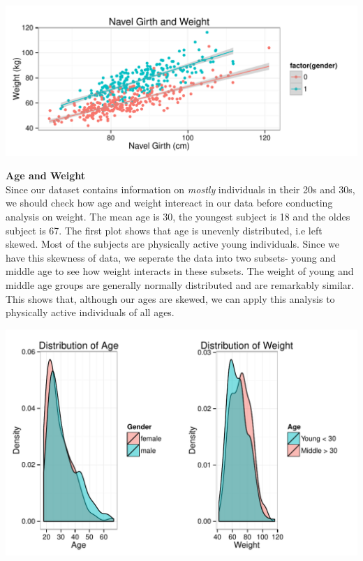\documentclass[11pt]{article}\usepackage[]{graphicx}\usepackage[]{color}
\makeatletter
\def\maxwidth{ %
  \ifdim\Gin@nat@width>\linewidth
    \linewidth
  \else
    \Gin@nat@width
  \fi
}
\newenvironment{knitrout}{}{} %
\makeatother
\begin{document}
\begin{knitrout}
\color{fgcolor}
\includegraphics[width=\maxwidth]{figure/navelgirth_plot} 

\end{knitrout}


\newpage

\textbf{Age and Weight}\\ %

Since our dataset contains information on \textit{mostly} individuals in their 20s and 30s, we should check how age and weight intereact in our data before conducting analysis on weight. The mean age is 30, the youngest subject is 18 and the oldes subject is 67. The first plot shows that age is unevenly distributed, i.e left skewed. Most of the subjects are physically active young individuals. Since we have this skewness of data, we seperate the data into two subsets- young and middle age to see how weight interacts in these subsets. The weight of young and middle age groups are generally normally distributed and are remarkably similar. This shows that, although our ages are skewed, we can apply this analysis to physically active individuals of all ages.

\begin{knitrout}
\color{fgcolor}
\includegraphics[width=\maxwidth]{figure/unnamed-chunk-1} 

\end{knitrout}
\end{document}

